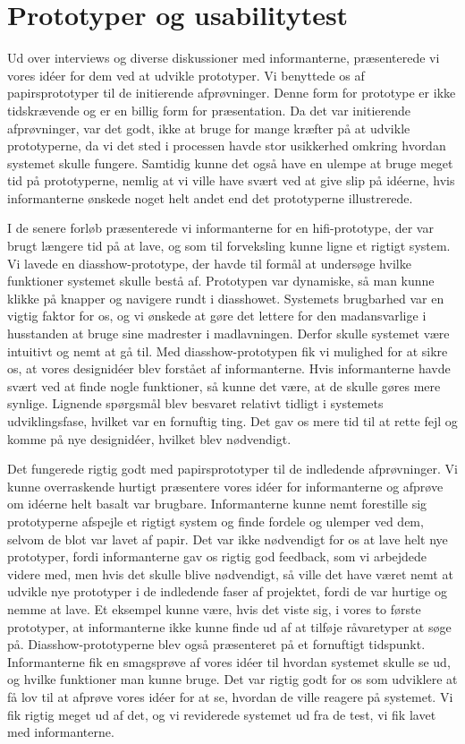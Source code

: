 \section{Prototyper og usabilitytest}
Ud over interviews og diverse diskussioner med informanterne, præsenterede vi vores idéer for dem ved at udvikle prototyper. Vi benyttede os af papirsprototyper til de initierende afprøvninger. Denne form for prototype er ikke tidskrævende og er en billig form for præsentation. Da det var initierende afprøvninger, var det godt, ikke at bruge for mange kræfter på at udvikle prototyperne, da vi det sted i processen havde stor usikkerhed omkring hvordan systemet skulle fungere. Samtidig kunne det også have en ulempe at bruge meget tid på prototyperne, nemlig at vi ville have svært ved at give slip på idéerne, hvis informanterne ønskede noget helt andet end det prototyperne illustrerede.

I de senere forløb præsenterede vi informanterne for en hifi-prototype, der var brugt længere tid på at lave, og som til forveksling kunne ligne et rigtigt system. Vi lavede en diasshow-prototype, der havde til formål at undersøge hvilke funktioner systemet skulle bestå af. Prototypen var dynamiske, så man kunne klikke på knapper og navigere rundt i diasshowet. Systemets brugbarhed var en vigtig faktor for os, og vi ønskede at gøre det lettere for den madansvarlige i husstanden at bruge sine madrester i madlavningen. Derfor skulle systemet være intuitivt og nemt at gå til. Med diasshow-prototypen fik vi mulighed for at sikre os, at vores designidéer blev forstået af informanterne. Hvis informanterne \fx havde svært ved at finde nogle funktioner, så kunne det være, at de skulle gøres mere synlige. Lignende spørgsmål blev besvaret relativt tidligt i systemets udviklingsfase, hvilket var en fornuftig ting. Det gav os mere tid til at rette fejl og komme på nye designidéer, hvilket blev nødvendigt.

Det fungerede rigtig godt med papirsprototyper til de indledende afprøvninger. Vi kunne overraskende hurtigt præsentere vores idéer for informanterne og afprøve om idéerne helt basalt var brugbare. Informanterne kunne nemt forestille sig prototyperne afspejle et rigtigt system og finde fordele og ulemper ved dem, selvom de blot var lavet af papir. Det var ikke nødvendigt for os at lave helt nye prototyper, fordi informanterne gav os rigtig god feedback, som vi arbejdede videre med, men hvis det skulle blive nødvendigt, så ville det have været nemt at udvikle nye prototyper i de indledende faser af projektet, fordi de var hurtige og nemme at lave. Et eksempel kunne være, hvis det viste sig, i vores to første prototyper, at informanterne ikke kunne finde ud af at tilføje råvaretyper at søge på. Diasshow-prototyperne blev også præsenteret på et fornuftigt tidspunkt. Informanterne fik en smagsprøve af vores idéer til hvordan systemet skulle se ud, og hvilke funktioner man kunne bruge. Det var rigtig godt for os som udviklere at få lov til at afprøve vores idéer for at se, hvordan de ville reagere på systemet. Vi fik rigtig meget ud af det, og vi reviderede systemet ud fra de test, vi fik lavet med informanterne.

